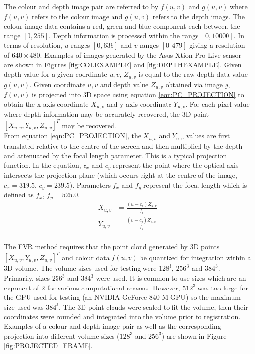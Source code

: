 The colour and depth image pair are referred to by $f(u,v)$ and $g(u,v)$ where $f(u,v)$ refers to the colour image and $g(u,v)$ refers to the depth image. The colour image data contains a red, green and blue component each between the range $[0,255]$. Depth information is processed within the range $[0,10000]$. In terms of resolution, $u$ ranges $[0,639]$ and $v$ ranges $[0,479]$ giving a resolution of $640 \times 480$. Examples of images generated by the Asus Xtion Pro Live sensor are shown in Figures \ref{fig:COLEXAMPLE} and \ref{fig:DEPTHEXAMPLE}. Given depth value for a given coordinate $u,v$, $Z_{u,v}$ is equal to the raw depth data value $g(u,v)$. Given coordinate $u,v$ and depth value $Z_{u,v}$ obtained via image $g$, $f(u,v)$ is projected into 3D space using equation \ref{eqn:PC_PROJECTION} to obtain the x-axis coordinate $X_{u,v}$ and y-axis coordinate $Y_{u,v}$. For each pixel value where depth information may be accurately recovered, the 3D point $[X_{u,v}, Y_{u,v}, Z_{u,v}]^T$ may be recovered. \\

From equation \ref{eqn:PC_PROJECTION}, the $X_{u,v}$ and $Y_{u,v}$ values are first translated relative to the centre of the screen and then multiplied by the depth and attenuated by the focal length parameter. This is a typical projection function. In the equation, $c_x$ and $c_y$ represent the point where the optical axis intersects the projection plane (which occurs right at the centre of the image, $c_x = 319.5$, $c_y = 239.5$). Parameters $f_x$ and $f_y$ represent the focal length which is defined as $f_x$, $f_y = 525.0$. \\


\begin{equation} \label{eqn:PC_PROJECTION}
\begin{split}
X_{u,v} & = \frac{(u - c_x)Z_{u,v}}{f_x} \\
Y_{u,v} & = \frac{(v - c_y)Z_{u,v}}{f_y} \\
\end{split}
\end{equation}

The FVR method requires that the point cloud generated by 3D points $[X_{u,v}, Y_{u,v}, Z_{u,v}]^T$ and colour data $f(u,v)$ be quantized for integration within a 3D volume. The volume sizes used for testing were $128^3$, $256^3$ and $384^3$. Primarily, sizes $256^3$ and $384^3$ were used. It is common to use sizes which are an exponent of 2 for various computational reasons. However, $512^3$ was too large for the GPU used for testing (an NVIDIA GeForce 840 M GPU) so the maximum size used was $384^3$. The 3D point clouds were scaled to fit the volume, then their coordinates were rounded and integrated into the volume prior to registration. Examples of a colour and depth image pair as well as the corresponding projection into different volume sizes ($128^3$ and $256^3$) are shown in Figure \ref{fig:PROJECTED_FRAME}.  \\

